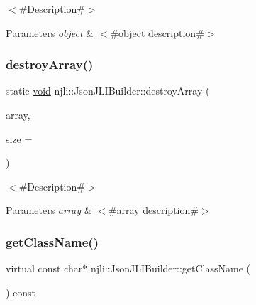 $<$\#\+Description\#$>$


\begin{DoxyParams}{Parameters}
{\em object} & $<$\#object description\#$>$ \\
\hline
\end{DoxyParams}
\mbox{\label{classnjli_1_1_json_j_l_i_builder_a776c04d38a57941bc0f314e7f417b2a1}} 
\subsubsection{\texorpdfstring{destroy\+Array()}{destroyArray()}}
{\footnotesize\ttfamily static \mbox{\hyperlink{_thread_8h_af1e856da2e658414cb2456cb6f7ebc66}{void}} njli\+::\+Json\+J\+L\+I\+Builder\+::destroy\+Array (\begin{DoxyParamCaption}\item[{\mbox{\hyperlink{classnjli_1_1_json_j_l_i_builder}{Json\+J\+L\+I\+Builder}} $\ast$$\ast$}]{array,  }\item[{const \mbox{\hyperlink{_util_8h_a10e94b422ef0c20dcdec20d31a1f5049}{u32}}}]{size = {} }\end{DoxyParamCaption})\hspace{0.3cm}{\ttfamily [static]}}

$<$\#\+Description\#$>$


\begin{DoxyParams}{Parameters}
{\em array} & $<$\#array description\#$>$ \\
\hline
\end{DoxyParams}
\mbox{\label{classnjli_1_1_json_j_l_i_builder_a673faf917817f3e3f4dd2215ce35857d}} 
\subsubsection{\texorpdfstring{get\+Class\+Name()}{getClassName()}}
{\footnotesize\ttfamily virtual const char$\ast$ njli\+::\+Json\+J\+L\+I\+Builder\+::get\+Class\+Name (\begin{DoxyParamCaption}{ }\end{DoxyParamCaption}) const\hspace{0.3cm}{\ttfamily [virtual]}}

